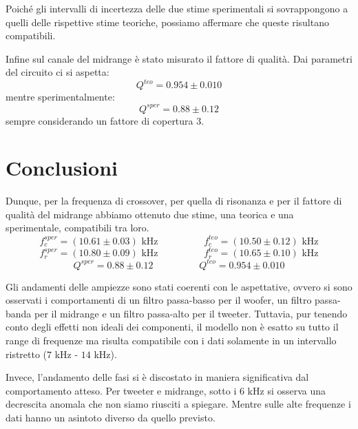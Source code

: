 \documentclass[12pt,italian]{article}
\begin{document}
\noindent
Poiché gli intervalli di incertezza delle due stime sperimentali si
sovrappongono a quelli delle rispettive stime teoriche, possiamo affermare che
queste risultano compatibili.

Infine sul canale del midrange è stato misurato il fattore di qualità. Dai
parametri del circuito ci si aspetta:
\begin{equation*}
	Q^{teo} = 0.954 \pm 0.010
\end{equation*}
mentre sperimentalmente:
\begin{equation*}
	Q^{sper} = 0.88 \pm 0.12
\end{equation*}
sempre considerando un fattore di copertura $3$.

\section*{Conclusioni}

Dunque, per la frequenza di crossover, per quella di risonanza e per il fattore
di qualità del midrange abbiamo ottenuto due stime, una teorica e una
sperimentale, compatibili tra loro.
\begin{equation*}
	f_{c}^{sper} = (10.61 \pm 0.03) \text{ kHz} \hspace{2cm}
	f_{c}^{teo} = (10.50 \pm 0.12) \text{ kHz}
\end{equation*}
\begin{equation*}
	f_{r}^{sper} = (10.80 \pm 0.09) \text{ kHz}
	\hspace{2cm} f_{r}^{teo} = (10.65 \pm 0.10) \text{ kHz}
\end{equation*}
\begin{equation*}
	Q^{sper} = 0.88 \pm 0.12 \hspace{2cm} Q^{teo} = 0.954 \pm 0.010
\end{equation*}

Gli andamenti delle ampiezze sono stati coerenti con le aspettative, ovvero si
sono osservati i comportamenti di un filtro passa-basso per il woofer, un
filtro passa-banda per il midrange e un filtro passa-alto per il tweeter.
Tuttavia, pur tenendo conto degli effetti non ideali dei componenti, il modello
non è esatto su tutto il range di frequenze ma risulta compatibile con i dati
solamente in un intervallo ristretto ($7$ kHz - $14$ kHz).

Invece, l'andamento delle fasi si è discostato in maniera significativa dal
comportamento atteso. Per tweeter e midrange, sotto i $6$ kHz si osserva una
decrescita anomala che non siamo riusciti a spiegare. Mentre sulle alte
frequenze i dati hanno un asintoto diverso da quello previsto.
\end{document}
